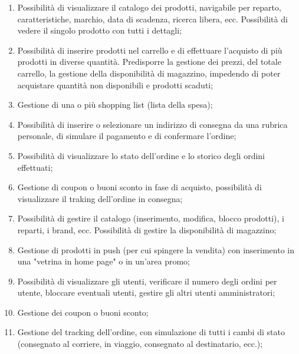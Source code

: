 \begin{enumerate}
		
	\item
		\label{f-up}
		Possibilità di visualizzare il catalogo dei prodotti, navigabile per reparto, caratteristiche, marchio, data di scadenza, ricerca libera, ecc.
		Possibilità di vedere il singolo prodotto con tutti i dettagli;
		
	\item
		Possibilità di inserire prodotti nel carrello e di effettuare l'acquisto di più prodotti in diverse quantità.
		Predisporre la gestione dei prezzi, del totale carrello, la gestione della disponibilità di magazzino, impedendo di poter acquistare quantità non disponibili e prodotti scaduti;
		
	\item
		Gestione di una o più shopping list (lista della spesa);
		
	\item
		Possibilità di inserire o selezionare un indirizzo di consegna da una rubrica personale, di simulare il pagamento e di confermare l'ordine;
		
	\item
		Possibilità di visualizzare lo stato dell'ordine e lo storico degli ordini effettuati;
		
	\item
		\label{ef-ur}
		Gestione di coupon o buoni sconto in fase di acquisto, possibilità di visualizzare il traking dell'ordine in consegna;
		
	\item
		\label{sf-ua}
		Possibilità di gestire il catalogo (inserimento, modifica, blocco prodotti), i reparti, i brand, ecc.
		Possibilità di gestire la disponibilità di magazzino;
	
	\item
		Gestione di prodotti in push (per cui spingere la vendita) con inserimento in una "vetrina in home page" o in un'area promo;
	
	\item
		Possibilità di visualizzare gli utenti, verificare il numero degli ordini per utente, bloccare eventuali utenti, gestire gli altri utenti amministratori;
	
	\item
		Gestione dei coupon o buoni sconto;
	
	\item
		\label{ef-ua}
		Gestione del tracking dell'ordine, con simulazione di tutti i cambi di stato (consegnato al corriere, in viaggio, consegnato al destinatario, ecc.);
		
\end{enumerate}

